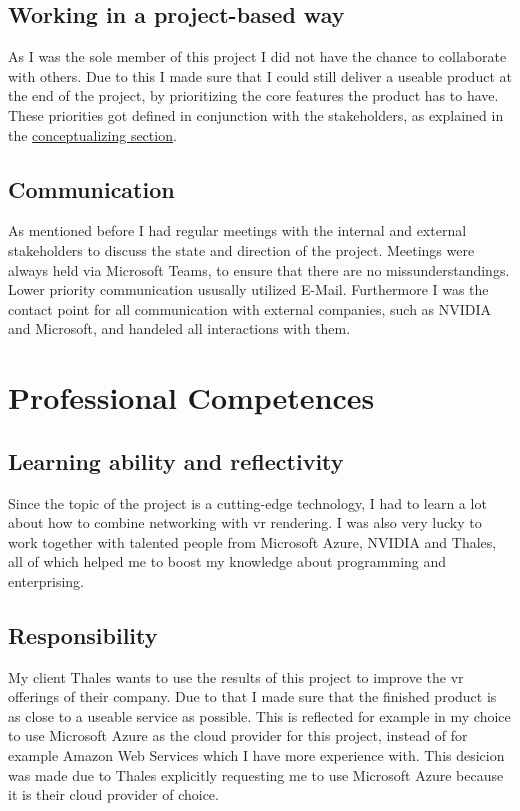 \documentclass[]{article}
\begin{document}
\subsection{Working in a project-based way}
As I was the sole member of this project I did not have the chance to collaborate with others. Due to this I made sure that I could still deliver a useable product at the end of the project, by prioritizing the core features the product has to have. These priorities got defined in conjunction with the stakeholders, as explained in the \hyperref[sec:conc]{conceptualizing section}.

\subsection{Communication}
As mentioned before I had regular meetings with the internal and external stakeholders to discuss the state and direction of the project. Meetings were always held via Microsoft Teams, to ensure that there are no missunderstandings. Lower priority communication ususally utilized E-Mail. Furthermore I was the contact point for all communication with external companies, such as NVIDIA and Microsoft, and handeled all interactions with them.

\section{Professional Competences}
\subsection{Learning ability and reflectivity}
Since the topic of the project is a cutting-edge technology, I had to learn a lot about how to combine networking with \acrshort{vr} rendering. I was also very lucky to work together with talented people from Microsoft Azure, NVIDIA and Thales, all of which helped me to boost my knowledge about programming and enterprising. 

\subsection{Responsibility}
My client Thales wants to use the results of this project to improve the \acrshort{vr} offerings of their company. Due to that I made sure that the finished product is as close to a useable service as possible. This is reflected for example in my choice to use Microsoft Azure as the cloud provider for this project, instead of for example Amazon Web Services which I have more experience with. This desicion was made due to Thales explicitly requesting me to use Microsoft Azure because it is their cloud provider of choice.

\printbibliography
\end{document}
